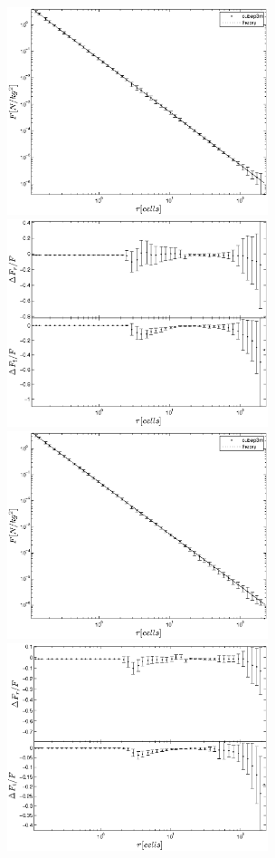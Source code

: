 \documentclass[useAMS,usenatbib]{mn2e}
\begin{document}
 \begin{figure}%
  \begin{center}
    \includegraphics[width=3.0in]{graphs/densityForce_ppext=2_rebin_new-1.eps}
    \includegraphics[width=3.0in]{graphs/densityForce_fracErr_ppext=2_rebin_new-1.eps}
     \includegraphics[width=3.0in]{graphs/densityForce_ppext=2_rebin_N10_new-1.eps}
    \includegraphics[width=3.0in]{graphs/densityForce_fracErr_ppext=2_rebin_N10_new-1.eps}

\end{center}
\end{figure}
\end{document}

